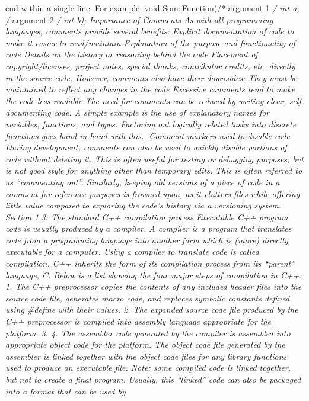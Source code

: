 end within a single line. For example: void SomeFunction(/* argument 1
\emph{/ int a, /} argument 2 \emph{/ int b); Importance of Comments As
with all programming languages, comments provide several beneﬁts:
Explicit documentation of code to make it easier to read/maintain
Explanation of the purpose and functionality of code Details on the
history or reasoning behind the code Placement of copyright/licenses,
project notes, special thanks, contributor credits, etc. directly in the
source code. However, comments also have their downsides: They must be
maintained to reﬂect any changes in the code Excessive comments tend to
make the code less readable The need for comments can be reduced by
writing clear, self-documenting code. A simple example is the use of
explanatory names for variables, functions, and types. Factoring out
logically related tasks into discrete functions goes hand-in-hand with
this. Comment markers used to disable code During development, comments
can also be used to quickly disable portions of code without deleting
it. This is often useful for testing or debugging purposes, but is not
good style for anything other than temporary edits. This is often
referred to as ``commenting out''. Similarly, keeping old versions of a
piece of code in a comment for reference purposes is frowned upon, as it
clutters ﬁles while oﬀering little value compared to exploring the
code's history via a versioning system. Section 1.3: The standard C++
compilation process Executable C++ program code is usually produced by a
compiler. A compiler is a program that translates code from a
programming language into another form which is (more) directly
executable for a computer. Using a compiler to translate code is called
compilation. C++ inherits the form of its compilation process from its
``parent'' language, C. Below is a list showing the four major steps of
compilation in C++: 1. The C++ preprocessor copies the contents of any
included header ﬁles into the source code ﬁle, generates macro code, and
replaces symbolic constants deﬁned using \#deﬁne with their values. 2.
The expanded source code ﬁle produced by the C++ preprocessor is
compiled into assembly language appropriate for the platform. 3. 4. The
assembler code generated by the compiler is assembled into appropriate
object code for the platform. The object code ﬁle generated by the
assembler is linked together with the object code ﬁles for any library
functions used to produce an executable ﬁle. Note: some compiled code is
linked together, but not to create a ﬁnal program. Usually, this
``linked'' code can also be packaged into a format that can be used by
}
